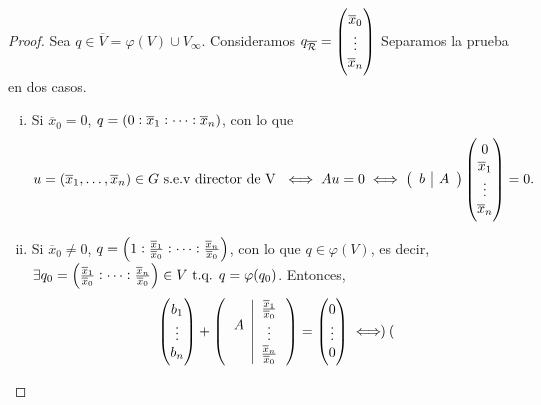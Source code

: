  \begin{proof}
   Sea $q \in \overline{V} = \varphi(V) \cup V_\infty$. 
   Consideramos $q_{\overline{\mathcal{R}}} = \begin{pmatrix}
     \overline{x}_0 \\ \vdots \\ \overline{x}_n 
   \end{pmatrix}$
   Separamos la prueba en dos casos.
   \begin{enumerate}[i)]
       \item Si $\overline{x}_0 = 0$, $q = \left( 0:\overline{x}_1:\dots:\overline{x}_n\right)$, con
         lo que
         \[u = \left( \overline{x}_1,\dots,\overline{x}_n \right) \in G \text{ s.e.v director
         de V } \iff Au = 0 \iff 
         \left( 
         \begin{array}{c|c} 
           b & A 
         \end{array}
         \right)
         \begin{pmatrix}
           0 \\
           \overline{x}_1 \\
           \vdots \\
           \overline{x}_n
         \end{pmatrix}
         = 0.
       \]
     \item Si $\overline{x}_0 \neq 0$, $q = \left( 1 : \frac{\overline{x}_1}{\overline{x}_0}
       : \dots : \frac{\overline{x}_n}{\overline{x}_0} \right)$, con lo que $q \in \varphi(V)$,
       es decir, $\exists q_0 =  \left( \frac{\overline{x}_1}{\overline{x}_0}
       : \dots : \frac{\overline{x}_n}{\overline{x}_0} \right) \in V \text{ t.q. } 
       q = \varphi(q_0)$. Entonces, 
       \begin{gather*} 
   \begin{pmatrix}
     b_1 \\ \vdots \\ b_n
   \end{pmatrix}
   +
   \lp
   \begin{tabular}{c|c} 
     \multirow{3}{*}{$A$} & $\frac{\overline{x}_1}{\overline{x}_0}$\\ 
     & $\vdots$  \\ & $ \frac{\overline{x}_n}{\overline{x}_0}$
    \end{tabular} 
    \rp
    =
    \begin{pmatrix}
     0 \\ \vdots \\ 0
   \end{pmatrix}
   \iff
\begin{pmatrix}

\end{pmatrix}
\end{gather*}
\end{enumerate}
\end{proof}
